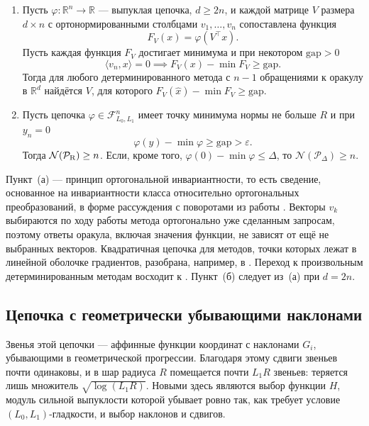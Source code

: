 \documentclass[11pt,a4paper]{article}
\newcommand{\R}{\mathbb R}
\newcommand{\F}{\mathcal F}
\newcommand{\ip}[2]{\langle #1,#2\rangle}
\begin{document}
\begin{proposition}\label{prop:reduction}
\leavevmode
\begin{enumerate}
\item[(а)] Пусть $\varphi:\R^n\to\R$ --- выпуклая цепочка, $d\ge2n$, и каждой матрице $V$ размера $d\times n$ с ортонормированными столбцами $v_1,\dots,v_n$ сопоставлена функция
\[
 F_V(x)=\varphi(V^\top x) .
\]
Пусть каждая функция $F_V$ достигает минимума и при некотором $\mathrm{gap}>0$
\begin{equation}\label{eq:hidden-gap}
 \ip{v_n}x=0\implies F_V(x)-\min F_V\ge\mathrm{gap}.
\end{equation}
Тогда для любого детерминированного метода с $n-1$ обращениями к оракулу в $\R^d$ найдётся $V$, для которого $F_V(\hat x)-\min F_V\ge\mathrm{gap}$.
\item[(б)] Пусть цепочка $\varphi\in\F_{L_0,L_1}^n$ имеет точку минимума нормы не больше $R$ и при $y_n=0$
\[
 \varphi(y)-\min\varphi\ge\mathrm{gap}>\varepsilon .
\]
Тогда $\mathcal N(\mathcal P_{\rm R})\ge n$. Если, кроме того, $\varphi(0)-\min\varphi\le\Delta$, то $\mathcal N(\mathcal P_\Delta)\ge n$.
\end{enumerate}
\end{proposition}

Пункт~(а) --- принцип ортогональной инвариантности, то есть сведение, основанное на инвариантности класса относительно ортогональных преобразований, в форме рассуждения с поворотами из работы \citet[§3.3]{carmon2020lower}. Векторы $v_k$ выбираются по ходу работы метода ортогонально уже сделанным запросам, поэтому ответы оракула, включая значения функции, не зависят от ещё не выбранных векторов. Квадратичная цепочка для методов, точки которых лежат в линейной оболочке градиентов, разобрана, например, в \citet[упражнение~1.3]{gasnikov2021modern}. Переход к произвольным детерминированным методам восходит к \citet{nemirovski1983problem}. Пункт~(б) следует из~(а) при $d=2n$.

\subsection{Цепочка с геометрически убывающими наклонами}\label{sec:ordered}

Звенья этой цепочки --- аффинные функции координат с наклонами $G_i$, убывающими в геометрической прогрессии. Благодаря этому сдвиги звеньев почти одинаковы, и в шар радиуса $R$ помещается почти $L_1R$ звеньев: теряется лишь множитель $\sqrt{\log(L_1R)}$. Новыми здесь являются выбор функции $H$, модуль сильной выпуклости которой убывает ровно так, как требует условие $(L_0,L_1)$-гладкости, и выбор наклонов и сдвигов.
\end{document}
